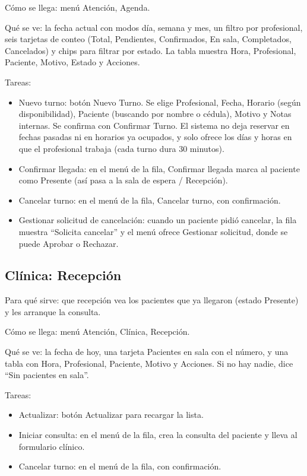 Cómo se llega: menú Atención, Agenda.

Qué se ve: la fecha actual con modos día, semana y mes, un filtro por profesional, seis tarjetas de conteo (Total, Pendientes, Confirmados, En sala, Completados, Cancelados) y chips para filtrar por estado. La tabla muestra Hora, Profesional, Paciente, Motivo, Estado y Acciones.

Tareas:
\begin{itemize}
  \item Nuevo turno: botón Nuevo Turno. Se elige Profesional, Fecha, Horario (según disponibilidad), Paciente (buscando por nombre o cédula), Motivo y Notas internas. Se confirma con Confirmar Turno. El sistema no deja reservar en fechas pasadas ni en horarios ya ocupados, y solo ofrece los días y horas en que el profesional trabaja (cada turno dura 30 minutos).
  \item Confirmar llegada: en el menú de la fila, Confirmar llegada marca al paciente como Presente (así pasa a la sala de espera / Recepción).
  \item Cancelar turno: en el menú de la fila, Cancelar turno, con confirmación.
  \item Gestionar solicitud de cancelación: cuando un paciente pidió cancelar, la fila muestra ``Solicita cancelar'' y el menú ofrece Gestionar solicitud, donde se puede Aprobar o Rechazar.
\end{itemize}

\subsection{Clínica: Recepción}
\label{sec:mu-clinica-recepcion}

Para qué sirve: que recepción vea los pacientes que ya llegaron (estado Presente) y les arranque la consulta.

Cómo se llega: menú Atención, Clínica, Recepción.

Qué se ve: la fecha de hoy, una tarjeta Pacientes en sala con el número, y una tabla con Hora, Profesional, Paciente, Motivo y Acciones. Si no hay nadie, dice ``Sin pacientes en sala''.

Tareas:
\begin{itemize}
  \item Actualizar: botón Actualizar para recargar la lista.
  \item Iniciar consulta: en el menú de la fila, crea la consulta del paciente y lleva al formulario clínico.
  \item Cancelar turno: en el menú de la fila, con confirmación.
\end{itemize}

